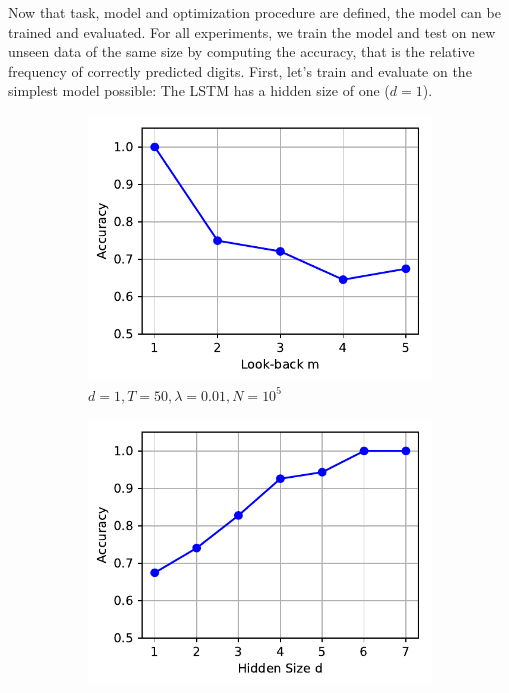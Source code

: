 		Now that task, model and optimization procedure are defined, the model can be trained and evaluated.
		For all experiments, we train the model and test on new unseen data of the same size by computing the accuracy, that is the relative frequency of correctly predicted digits.
		First, let's train and evaluate on the simplest model possible: The LSTM has a hidden size of one ($d = 1$).
		\begin{figure}[tb]
			\centering
			\begin{subfigure}[b]{0.5\linewidth}
				\centering
				\includegraphics[width=\linewidth]{Images/Python-Plots/memory/accuracy-vs-look-back}
				\caption{
					$d = 1, T = 50, \lambda = 0.01, N = 10^5$
					\label{fig:accuracy-vs-look-back}
				}
			\end{subfigure}%
			\begin{subfigure}[b]{0.5\linewidth}
				\includegraphics[width=\linewidth]{Images/Python-Plots/memory/accuracy-vs-hidden-size}

\end{subfigure}
\end{figure}
